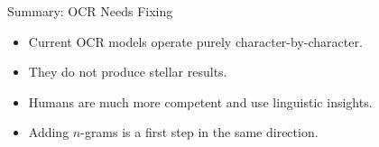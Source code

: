 \documentclass[professionalfonts, xcolor={usenames,svgnames,x11names,table}]{beamer}
\begin{document}
\begin{frame}{Summary: OCR Needs Fixing}
    \begin{itemize}
        \item Current OCR models operate purely character-by-character.
        \item They do not produce stellar results.\\
        \item Humans are much more competent and use linguistic insights.
        \item Adding $n$-grams is a first step in the same direction.
    \end{itemize}
\end{frame}
\end{document}
